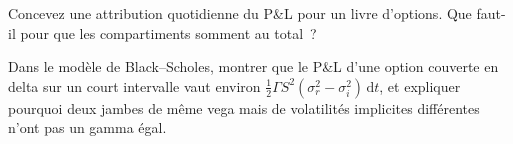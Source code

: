 \begin{interviewq}\label{iq:s2:skew-and-term-structure-relative-value:5}
Concevez une attribution quotidienne du P\&L pour un livre d'options. Que faut-il pour que les compartiments somment au total~?
\end{interviewq}

\begin{interviewq}\label{iq:s2:skew-and-term-structure-relative-value:6}
Dans le modèle de Black--Scholes, montrer que le P\&L d'une option couverte en delta sur un court intervalle vaut environ $\tfrac12\Gamma S^2(\sigma_r^2 -
\sigma_i^2)\,\mathrm{d}t$, et expliquer pourquoi deux jambes de même vega mais de volatilités implicites différentes n'ont pas un gamma égal.
\end{interviewq}
